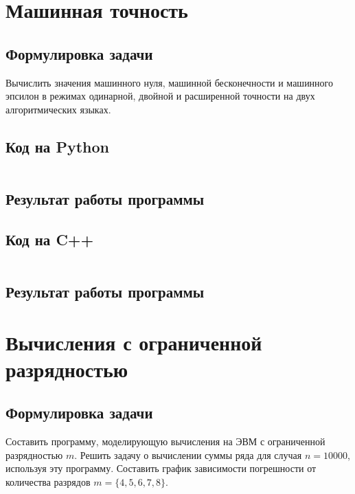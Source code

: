 \documentclass[a4paper,12pt]{article}
\newenvironment{longlisting}{\captionsetup{type=listing}}{}
\begin{document}
\section{Машинная точность}
\subsection{Формулировка задачи}
Вычислить значения машинного нуля, машинной бесконечности и машинного эпсилон в режимах одинарной, двойной и расширенной точности на двух алгоритмических языках.
\subsection{Код на Python}

\begin{longlisting}
\inputminted{python}{precision.py}
\end{longlisting}

\subsection{Результат работы программы}
\begin{longlisting}

\end{longlisting}

\subsection{Код на C++}
\begin{longlisting}
\inputminted{c++}{precision.cpp}
\end{longlisting}

\subsection{Результат работы программы}
\begin{longlisting}

\end{longlisting}


\section{Вычисления с ограниченной разрядностью}
\subsection{Формулировка задачи}
Составить программу, моделирующую вычисления на ЭВМ с ограниченной разрядностью $m$.
Решить задачу о вычислении суммы ряда для случая $n=10000$, используя эту программу. Составить график зависимости погрешности от количества разрядов $m = \{4, 5, 6, 7, 8\}$.
\end{document}
